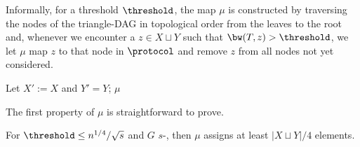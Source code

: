 Informally, for a threshold $\threshold$, the map $\mu$ is constructed by traversing the nodes of the triangle-DAG in topological order from the leaves to the root and, whenever we encounter a $z\in X\sqcup Y$ such that $\bw(T,z)> \threshold$, we let $\mu$ map $z$ to that node in $\protocol$ and remove $z$ from all nodes not yet considered.


\begin{algorithm2e}[t]
    Let $X':= X$ and $Y' = Y$;
     $\mu$
\caption{Definition of $\mu$}
\label{alg:1}
\end{algorithm2e}

The first property of $\mu$ is straightforward
{}{to prove}.
\begin{lemma}
\label{lemma:many x are assigned}
For $\threshold\leq n^{1/4}/\sqrt{s}$ and $G$ $s$-\ndense, then 
$\mu$ assigns at least $\lvert X \sqcup Y\rvert /4$ elements. 
\end{lemma}


